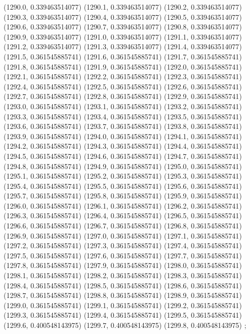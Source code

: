 {					(1290.0, 0.339463514077)
					(1290.1, 0.339463514077)
					(1290.2, 0.339463514077)
					(1290.3, 0.339463514077)
					(1290.4, 0.339463514077)
					(1290.5, 0.339463514077)
					(1290.6, 0.339463514077)
					(1290.7, 0.339463514077)
					(1290.8, 0.339463514077)
					(1290.9, 0.339463514077)
					(1291.0, 0.339463514077)
					(1291.1, 0.339463514077)
					(1291.2, 0.339463514077)
					(1291.3, 0.339463514077)
					(1291.4, 0.339463514077)
					(1291.5, 0.361545885741)
					(1291.6, 0.361545885741)
					(1291.7, 0.361545885741)
					(1291.8, 0.361545885741)
					(1291.9, 0.361545885741)
					(1292.0, 0.361545885741)
					(1292.1, 0.361545885741)
					(1292.2, 0.361545885741)
					(1292.3, 0.361545885741)
					(1292.4, 0.361545885741)
					(1292.5, 0.361545885741)
					(1292.6, 0.361545885741)
					(1292.7, 0.361545885741)
					(1292.8, 0.361545885741)
					(1292.9, 0.361545885741)
					(1293.0, 0.361545885741)
					(1293.1, 0.361545885741)
					(1293.2, 0.361545885741)
					(1293.3, 0.361545885741)
					(1293.4, 0.361545885741)
					(1293.5, 0.361545885741)
					(1293.6, 0.361545885741)
					(1293.7, 0.361545885741)
					(1293.8, 0.361545885741)
					(1293.9, 0.361545885741)
					(1294.0, 0.361545885741)
					(1294.1, 0.361545885741)
					(1294.2, 0.361545885741)
					(1294.3, 0.361545885741)
					(1294.4, 0.361545885741)
					(1294.5, 0.361545885741)
					(1294.6, 0.361545885741)
					(1294.7, 0.361545885741)
					(1294.8, 0.361545885741)
					(1294.9, 0.361545885741)
					(1295.0, 0.361545885741)
					(1295.1, 0.361545885741)
					(1295.2, 0.361545885741)
					(1295.3, 0.361545885741)
					(1295.4, 0.361545885741)
					(1295.5, 0.361545885741)
					(1295.6, 0.361545885741)
					(1295.7, 0.361545885741)
					(1295.8, 0.361545885741)
					(1295.9, 0.361545885741)
					(1296.0, 0.361545885741)
					(1296.1, 0.361545885741)
					(1296.2, 0.361545885741)
					(1296.3, 0.361545885741)
					(1296.4, 0.361545885741)
					(1296.5, 0.361545885741)
					(1296.6, 0.361545885741)
					(1296.7, 0.361545885741)
					(1296.8, 0.361545885741)
					(1296.9, 0.361545885741)
					(1297.0, 0.361545885741)
					(1297.1, 0.361545885741)
					(1297.2, 0.361545885741)
					(1297.3, 0.361545885741)
					(1297.4, 0.361545885741)
					(1297.5, 0.361545885741)
					(1297.6, 0.361545885741)
					(1297.7, 0.361545885741)
					(1297.8, 0.361545885741)
					(1297.9, 0.361545885741)
					(1298.0, 0.361545885741)
					(1298.1, 0.361545885741)
					(1298.2, 0.361545885741)
					(1298.3, 0.361545885741)
					(1298.4, 0.361545885741)
					(1298.5, 0.361545885741)
					(1298.6, 0.361545885741)
					(1298.7, 0.361545885741)
					(1298.8, 0.361545885741)
					(1298.9, 0.361545885741)
					(1299.0, 0.361545885741)
					(1299.1, 0.361545885741)
					(1299.2, 0.361545885741)
					(1299.3, 0.361545885741)
					(1299.4, 0.361545885741)
					(1299.5, 0.361545885741)
					(1299.6, 0.400548143975)
					(1299.7, 0.400548143975)
					(1299.8, 0.400548143975)
				};
